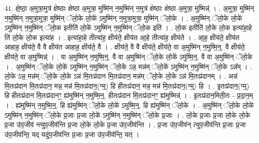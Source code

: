 \documentclass[17pt]{extarticle}
\begin{document}
41. क्षे॒ष्ठा॒ अ॒मुत्रा॒मुत्र॑ क्षेष्ठाः क्षेष्ठा अ॒मुत्रा॒ मुष्मि॑न् न॒मुष्मि॑न् न॒मुत्र॑ क्षेष्ठाः क्षेष्ठा अ॒मुत्रा॒ मुष्मिन्न्॑ । . अ॒मुत्रा॒ मुष्मि॑न् न॒मुष्मि॑न् न॒मुत्रा॒मुत्रा॒ मुष्मि॑न् ॅलो॒के लो॒के॑ ऽमुष्मि॑न् न॒मुत्रा॒मुत्रा॒ मुष्मि॑न् ॅलो॒के । . अ॒मुष्मि॑न् ॅलो॒के लो॒के॑ ऽमुष्मि॑न् न॒मुष्मि॑न् ॅलो॒क इतीति॑ लो॒के॑ ऽमुष्मि॑न् न॒मुष्मि॑न् ॅलो॒क इति॑ । . लो॒क इतीति॑ लो॒के लो॒क इत्या॑हा॒हे ति॑ लो॒के लो॒क इत्या॑ह । . इत्या॑हा॒हे तीत्या॑ह॒ क्षीय॑ते॒ क्षीय॑त आ॒हे तीत्या॑ह॒ क्षीय॑ते । . आ॒ह॒ क्षीय॑ते॒ क्षीय॑त आहाह॒ क्षीय॑ते॒ वै वै क्षीय॑त आहाह॒ क्षीय॑ते॒ वै । . क्षीय॑ते॒ वै वै क्षीय॑ते॒ क्षीय॑ते॒ वा अ॒मुष्मि॑न् न॒मुष्मि॒न्॒. वै क्षीय॑ते॒ क्षीय॑ते॒ वा अ॒मुष्मिन्न्॑ । . वा अ॒मुष्मि॑न् न॒मुष्मि॒न्॒. वै वा अ॒मुष्मि॑न् ॅलो॒के लो॒के॑ ऽमुष्मि॒न्॒. वै वा अ॒मुष्मि॑न् ॅलो॒के । . अ॒मुष्मि॑न् ॅलो॒के लो॒के॑ ऽमुष्मि॑न् न॒मुष्मि॑न् ॅलो॒के ऽन्न॒ मन्न॑म् ॅलो॒के॑ ऽमुष्मि॑न् न॒मुष्मि॑न् ॅलो॒के ऽन्न᳚म् । . लो॒के ऽन्न॒ मन्न॑म् ॅलो॒के लो॒के ऽन्न॑ मि॒तःप्र॑दान मि॒तःप्र॑दान॒ मन्न॑म् ॅलो॒के लो॒के ऽन्न॑ मि॒तःप्र॑दानम् । . अन्न॑ मि॒तःप्र॑दान मि॒तःप्र॑दान॒ मन्न॒ मन्न॑ मि॒तःप्र॑दान॒(ग्म्॒) हि हीतःप्र॑दान॒ मन्न॒ मन्न॑ मि॒तःप्र॑दान॒(ग्म्॒) हि । . इ॒तःप्र॑दान॒(ग्म्॒) हि हीतःप्र॑दान मि॒तःप्र॑दानꣳ॒॒ ह्य॑मुष्मि॑न् न॒मुष्मि॒न्॒. हीतःप्र॑दान मि॒तःप्र॑दानꣳ॒॒ ह्य॑मुष्मिन्न्॑ । . इ॒तःप्र॑दान॒मिती॒तः - प्र॒दा॒न॒म् । . ह्य॑मुष्मि॑न् न॒मुष्मि॒न्॒. हि ह्य॑मुष्मि॑न् ॅलो॒के लो॒के॑ ऽमुष्मि॒न्॒. हि ह्य॑मुष्मि॑न् ॅलो॒के । . अ॒मुष्मि॑न् ॅलो॒के लो॒के॑ ऽमुष्मि॑न् न॒मुष्मि॑न् ॅलो॒के प्र॒जाः प्र॒जा लो॒के॑ ऽमुष्मि॑न् न॒मुष्मि॑न् ॅलो॒के प्र॒जाः । . लो॒के प्र॒जाः प्र॒जा लो॒के लो॒के प्र॒जा उ॑प॒जीव॑ न्त्युप॒जीव॑न्ति प्र॒जा लो॒के लो॒के प्र॒जा उ॑प॒जीव॑न्ति । . प्र॒जा उ॑प॒जीव॑न् त्युप॒जीव॑न्ति प्र॒जाः प्र॒जा उ॑प॒जीव॑न्ति॒ यद् यदु॑प॒जीव॑न्ति प्र॒जाः प्र॒जा उ॑प॒जीव॑न्ति॒ यत् । \newline
\end{document}
